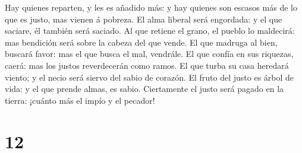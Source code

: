  Hay quienes reparten, y les es añadido más: y hay
quienes son escasos más de lo que es justo, mas vienen á pobreza.
 El alma liberal será engordada: y el que saciare, él
también será saciado.  Al que retiene el grano, el pueblo
lo maldecirá: mas bendición será sobre la cabeza del que vende.
 El que madruga al bien, buscará favor: mas el que busca
el mal, vendrále.  El que confía en sus riquezas, caerá:
mas los justos reverdecerán como ramos.  El que turba su
casa heredará viento; y el necio será siervo del sabio de corazón.
 El fruto del justo es árbol de vida: y el que prende
almas, es sabio.  Ciertamente el justo será pagado en la
tierra: ¡cuánto más el impío y el pecador!

\hypertarget{section-11}{%
\section{12}\label{section-11}}

